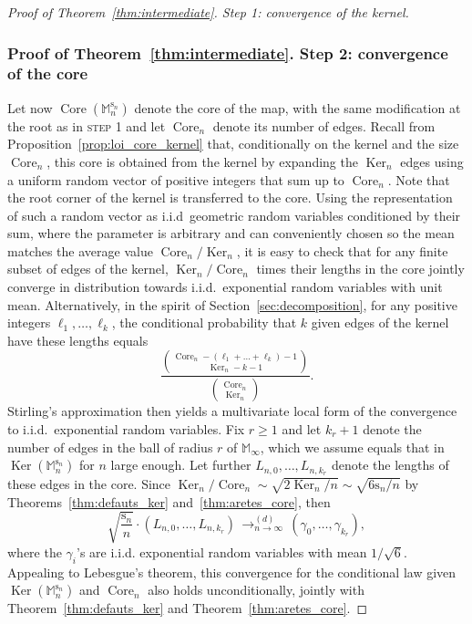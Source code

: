 \documentclass[10pt]{amsart}
\theoremstyle{plain}
\theoremstyle{definition}
\theoremstyle{remark}
\newcommand{\Mapb}{\mathbb{M}}
\newcommand{\spar}{\mathrm{s}}
\DeclareMathOperator{\Core}{Core}
\DeclareMathOperator{\Ker}{Ker}
\newcommand{\cvloi}[1][n]{\,\mathop{\longrightarrow}^{(d)}_{#1 \to \infty}\,}
\begin{document}
\begin{proof}[Proof of Theorem~\ref{thm:intermediate}. Step 1: convergence of the kernel]
\subsubsection*{Proof of Theorem~\ref{thm:intermediate}. Step 2: convergence of the core}
Let now $\Core(\Mapb_n^{\spar_n})$ denote the core of the map, with the same modification at the root as in \textsc{step 1} and let $\Core_n$ denote its number of edges.
Recall from Proposition~\ref{prop:loi_core_kernel} that, conditionally on the kernel and the size $\Core_n$, this core is obtained from the kernel by expanding the $\Ker_n$ edges using a uniform random vector of positive integers that sum up to $\Core_n$. Note that the root corner of the kernel is transferred to the core.
Using the representation of such a random vector as i.i.d~geometric random variables conditioned by their sum, where the parameter is arbitrary and can conveniently chosen so the mean matches the average value $\Core_n/\Ker_n$, it is easy to check that for any finite subset of edges of the kernel, $\Ker_n / \Core_n$ times their lengths in the core jointly converge in distribution towards i.i.d.~exponential random variables with unit mean. Alternatively, in the spirit of Section~\ref{sec:decomposition}, for any positive integers $\ell_1, \dots, \ell_k$, the conditional probability that $k$ given edges of the kernel have these lengths equals
\[
\frac{\binom{\Core_n-(\ell_1+\dots+\ell_k)-1}{\Ker_n-k-1}}{\binom{\Core_n}{\Ker_n}}.
\]
Stirling's approximation then yields a multivariate local form of the convergence to i.i.d.~exponential random variables.
Fix $r \ge 1$ and let $k_r+1$ denote the number of edges in the ball of radius $r$ of $\Mapb_\infty$, which we assume equals that in $\Ker(\Mapb_n^{\spar_n})$ for $n$ large enough. Let further $L_{n,0}, \dots, L_{n,k_r}$ denote the lengths of these edges in the core. Since $\Ker_n / \Core_n \sim \sqrt{2\Ker_n/n} \sim \sqrt{6\spar_n/n}$ by Theorems~\ref{thm:defauts_ker} and~\ref{thm:aretes_core}, then
\begin{equation}\label{eq:convergence_longueurs_core}
\sqrt{\frac{\spar_n}{n}} \cdot \left(L_{n,0}, \dots, L_{n,k_r}\right) \cvloi (\gamma_0, \dots, \gamma_{k_r}),
\end{equation}
where the $\gamma_i$'s are i.i.d. exponential random variables with mean $1/\sqrt{6}$. Appealing to \eg Lebesgue's theorem, this convergence for the conditional law given $\Ker(\Mapb_n^{\spar_n})$ and $\Core_n$ also holds unconditionally, jointly with Theorem~\ref{thm:defauts_ker} and Theorem~\ref{thm:aretes_core}.


\end{proof}
\end{document}

